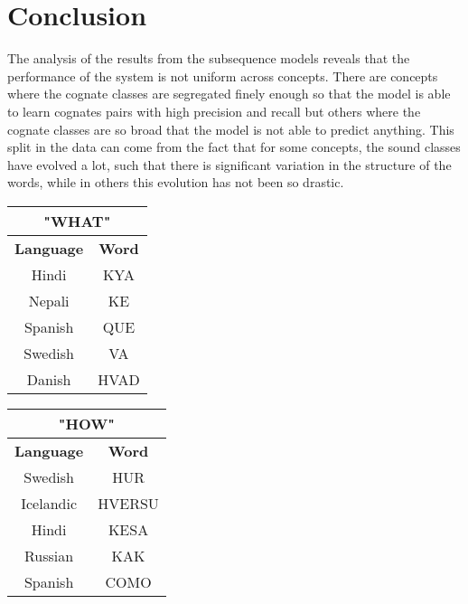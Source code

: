 \chapter{Conclusion}

The analysis of the results from the subsequence models reveals that the performance of the system is not uniform across concepts. There are concepts where the cognate classes are segregated finely enough so that the model is able to learn cognates pairs with high precision and recall but others where the cognate classes are so broad that the model is not able to predict anything. This split in the data can come from the fact that for some concepts, the sound classes have evolved a lot, such that there is significant variation in the structure of the words, while in others this evolution has not been so drastic. 

\begin{table}[h]
\centering
	\begin{minipage}{.5\linewidth}
      \centering

\begin{tabular}{|c|c|}
\hline
\multicolumn{2}{|c|}{\textbf{"WHAT"}} \\ \hline
\textbf{Language}   & \textbf{Word}   \\ \hline
Hindi               & KYA             \\ \hline
Nepali              & KE              \\ \hline
Spanish             & QUE             \\ \hline
Swedish             & VA              \\ \hline
Danish              & HVAD            \\ \hline
\end{tabular}


	\end{minipage}%
    \begin{minipage}{.5\linewidth}
    \centering

\begin{tabular}{|c|c|}
\hline
\multicolumn{2}{|c|}{\textbf{"HOW"}} \\ \hline
\textbf{Language}   & \textbf{Word}  \\ \hline
Swedish             & HUR            \\ \hline
Icelandic           & HVERSU         \\ \hline
Hindi               & KESA           \\ \hline
Russian             & KAK            \\ \hline
Spanish             & COMO           \\ \hline
\end{tabular}

	\end{minipage} 
\end{table}

